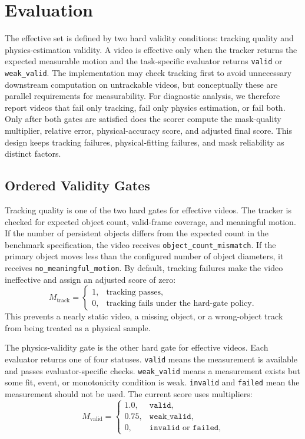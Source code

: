 \documentclass{article}
\begin{document}
\section{Evaluation}

The effective set is defined by two hard validity conditions: tracking quality and physics-estimation validity.
A video is effective only when the tracker returns the expected measurable motion and the task-specific evaluator returns \texttt{valid} or \texttt{weak\_valid}.
The implementation may check tracking first to avoid unnecessary downstream computation on untrackable videos, but conceptually these are parallel requirements for measurability.
For diagnostic analysis, we therefore report videos that fail only tracking, fail only physics estimation, or fail both.
Only after both gates are satisfied does the scorer compute the mask-quality multiplier, relative error, physical-accuracy score, and adjusted final score.
This design keeps tracking failures, physical-fitting failures, and mask reliability as distinct factors.

\subsection{Ordered Validity Gates}

Tracking quality is one of the two hard gates for effective videos.
The tracker is checked for expected object count, valid-frame coverage, and meaningful motion.
If the number of persistent objects differs from the expected count in the benchmark specification, the video receives \texttt{object\_count\_mismatch}.
If the primary object moves less than the configured number of object diameters, it receives \texttt{no\_meaningful\_motion}.
By default, tracking failures make the video ineffective and assign an adjusted score of zero:
\begin{equation}
    M_{\mathrm{track}} =
    \begin{cases}
    1, & \text{tracking passes},\\
    0, & \text{tracking fails under the hard-gate policy}.
    \end{cases}
\end{equation}
This prevents a nearly static video, a missing object, or a wrong-object track from being treated as a physical sample.

The physics-validity gate is the other hard gate for effective videos.
Each evaluator returns one of four statuses.
\texttt{valid} means the measurement is available and passes evaluator-specific checks.
\texttt{weak\_valid} means a measurement exists but some fit, event, or monotonicity condition is weak.
\texttt{invalid} and \texttt{failed} mean the measurement should not be used.
The current score uses multipliers:
\begin{equation}
    M_{\mathrm{valid}} =
    \begin{cases}
    1.0, & \texttt{valid},\\
    0.75, & \texttt{weak\_valid},\\
    0, & \texttt{invalid} \text{ or } \texttt{failed},
    \end{cases}
\end{equation}
\end{document}
